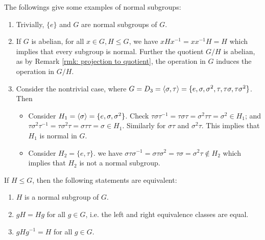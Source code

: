 \documentclass{article}
\begin{document}
\begin{example}
    The followings give some examples of normal subgroups:
    \begin{enumerate}
        \item Trivially, $\{e\}$ and $G$ are normal subgroups of $G$.
        \item If $G$ is abelian, for all $x \in G, H \leq G$, we have $xHx^{-1} = xx^{-1}H = H$ which implies that every subgroup is normal. Further the quotient $G/H$ is abelian, as by Remark \ref{rmk: projection to quotient}, the operation in $G$ induces the operation in $G/H$.
        \item Consider the nontrivial case, where $G = D_3 = \left\langle \sigma, \tau \right\rangle = \{e, \sigma, \sigma^2, \tau, \tau\sigma, \tau\sigma^2\}$. Then
            \begin{itemize}
                \item Consider $H_1 = \left\langle \sigma \right\rangle = \{e, \sigma, \sigma^2\}$. Check $\tau\sigma\tau^{-1} = \tau\sigma\tau = \sigma^2\tau\tau = \sigma^2 \in H_1$; and $\tau\sigma^2\tau^{-1} = \tau\sigma^2\tau = \sigma\tau\tau = \sigma \in H_1$. Similarly for $\sigma\tau$ and $\sigma^2\tau$. This implies that $H_1$ is normal in $G$.
                \item Consider $H_2 = \{ e, \tau \}$. we have $\sigma\tau\sigma^{-1} = \sigma\tau\sigma^2 = \tau\sigma = \sigma^2 \tau \notin H_2$ which implies that $H_2$ is not a normal subgroup.
            \end{itemize}
    \end{enumerate}
\end{example}

\begin{proposition}\label{prop: equivalence definition of normal subgroup}
    If $H \leq G$, then the following statements are equivalent:
    \begin{enumerate}[label=\arabic*)]
        \item $H$ is a normal subgroup of $G$.
        \item $gH = Hg$ for all $g \in G$, i.e. the left and right equivalence classes are equal.
        \item $gHg^{-1} = H$ for all $g \in G$.
    \end{enumerate}
\end{proposition}
\end{document}
